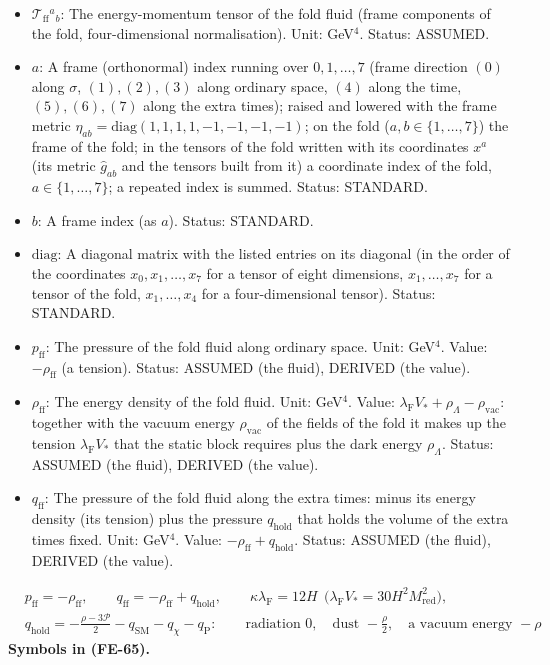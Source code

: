 \documentclass[
  10pt,
]{article}
\providecommand{\tightlist}{%
  \setlength{\itemsep}{0pt}\setlength{\parskip}{0pt}}
\begin{document}
\begin{itemize}
\tightlist
\item
  \(\mathcal{T}_{\mathrm{ff}}{}^a{}_b\): The energy-momentum tensor of
  the fold fluid (frame components of the fold, four-dimensional
  normalisation). Unit: GeV\(^4\). Status: ASSUMED.
\item
  \(a\): A frame (orthonormal) index running over \(0, 1, \dots, 7\)
  (frame direction \((0)\) along \(\sigma\), \((1), (2), (3)\) along
  ordinary space, \((4)\) along the time, \((5), (6), (7)\) along the
  extra times); raised and lowered with the frame metric
  \(\eta_{ab} = \mathrm{diag}(1, 1, 1, 1, -1, -1, -1, -1)\); on the fold
  (\(a, b \in \{1, \dots, 7\}\)) the frame of the fold; in the tensors
  of the fold written with its coordinates \(x^a\) (its metric
  \(\hat g_{ab}\) and the tensors built from it) a coordinate index of
  the fold, \(a \in \{1, \dots, 7\}\); a repeated index is summed.
  Status: STANDARD.
\item
  \(b\): A frame index (as \(a\)). Status: STANDARD.
\item
  \(\mathrm{diag}\): A diagonal matrix with the listed entries on its
  diagonal (in the order of the coordinates \(x_0, x_1, \dots, x_7\) for
  a tensor of eight dimensions, \(x_1, \dots, x_7\) for a tensor of the
  fold, \(x_1, \dots, x_4\) for a four-dimensional tensor). Status:
  STANDARD.
\item
  \(p_{\mathrm{ff}}\): The pressure of the fold fluid along ordinary
  space. Unit: GeV\(^4\). Value: \(-\rho_{\mathrm{ff}}\) (a tension).
  Status: ASSUMED (the fluid), DERIVED (the value).
\item
  \(\rho_{\mathrm{ff}}\): The energy density of the fold fluid. Unit:
  GeV\(^4\). Value:
  \(\lambda_{\mathrm{F}}V_* + \rho_\Lambda - \rho_{\mathrm{vac}}\):
  together with the vacuum energy \(\rho_{\mathrm{vac}}\) of the fields
  of the fold it makes up the tension \(\lambda_{\mathrm{F}}V_*\) that
  the static block requires plus the dark energy \(\rho_\Lambda\).
  Status: ASSUMED (the fluid), DERIVED (the value).
\item
  \(q_{\mathrm{ff}}\): The pressure of the fold fluid along the extra
  times: minus its energy density (its tension) plus the pressure
  \(q_{\mathrm{hold}}\) that holds the volume of the extra times fixed.
  Unit: GeV\(^4\). Value: \(-\rho_{\mathrm{ff}} + q_{\mathrm{hold}}\).
  Status: ASSUMED (the fluid), DERIVED (the value).
\end{itemize}

\[
\begin{aligned}
&p_{\mathrm{ff}} = -\rho_{\mathrm{ff}},\qquad q_{\mathrm{ff}} = -\rho_{\mathrm{ff}} + q_{\mathrm{hold}},\qquad
 \kappa\lambda_{\mathrm{F}} = 12H\ \ \big(\lambda_{\mathrm{F}}V_* = 30H^2M_{\mathrm{red}}^2\big),\\
&q_{\mathrm{hold}} = -\frac{\rho - 3\mathcal{P}}{2} - q_{\mathrm{SM}} - q_\chi - q_{\mathrm{P}}:\qquad
 \text{radiation } 0,\quad \text{dust } -\frac{\rho}{2},\quad \text{a vacuum energy } -\rho
\end{aligned} \tag{FE-65}
\] \textbf{Symbols in (FE-65).}
\end{document}
